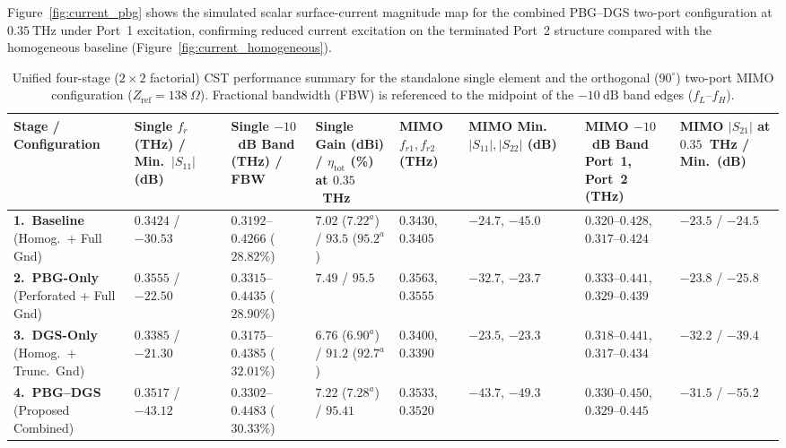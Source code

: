 \documentclass[referee,pdflatex,sn-mathphys-ay]{sn-jnl}
\begin{document}
Figure~\ref{fig:current_pbg} shows the simulated scalar surface-current magnitude map for the combined PBG--DGS two-port configuration at \(0.35~\mathrm{THz}\) under Port~1 excitation, confirming reduced current excitation on the terminated Port~2 structure compared with the homogeneous baseline (Figure~\ref{fig:current_homogeneous}).

\begin{table}[ht]
\caption{Unified four-stage ($2 \times 2$ factorial) CST performance summary for the standalone single element and the orthogonal ($90^{\circ}$) two-port MIMO configuration ($Z_{\mathrm{ref}} = 138~\Omega$). Fractional bandwidth (FBW) is referenced to the midpoint of the $-10~\mathrm{dB}$ band edges ($f_L$--$f_H$).}
\label{tab:four_stage_summary}
\centering
\renewcommand{\arraystretch}{1.2}
\scriptsize
\setlength{\tabcolsep}{3pt}
\begin{tabularx}{\textwidth}{@{}>{\raggedright\arraybackslash}p{2.3cm} C{1.75cm} C{1.85cm} C{2.05cm} C{1.55cm} C{1.65cm} C{1.85cm} >{\centering\arraybackslash}X@{}}
\toprule
\textbf{Stage / Configuration} & \textbf{Single $f_r$ (THz) / Min.\ $|S_{11}|$ (dB)} & \textbf{Single $-10$~dB Band (THz) / FBW} & \textbf{Single Gain (dBi) / $\eta_{\mathrm{tot}}$ (\%) at $0.35$~THz} & \textbf{MIMO $f_{r1}, f_{r2}$ (THz)} & \textbf{MIMO Min.\ $|S_{11}|, |S_{22}|$ (dB)} & \textbf{MIMO $-10$~dB Band Port~1, Port~2 (THz)} & \textbf{MIMO $|S_{21}|$ at $0.35$~THz / Min.\ (dB)} \\
\midrule
\textbf{1.\ Baseline} (Homog.\ + Full Gnd) & $0.3424$ / $-30.53$ & $0.3192$--$0.4266$ ($28.82\%$) & $7.02$ ($7.22^{a}$) / $93.5$ ($95.2^{a}$) & $0.3430$, $0.3405$ & $-24.7$, $-45.0$ & $0.320$--$0.428$, $0.317$--$0.424$ & $-23.5$ / $-24.5$ \\
\textbf{2.\ PBG-Only} (Perforated + Full Gnd) & $0.3555$ / $-22.50$ & $0.3315$--$0.4435$ ($28.90\%$) & $7.49$ / $95.5$ & $0.3563$, $0.3555$ & $-32.7$, $-23.7$ & $0.333$--$0.441$, $0.329$--$0.439$ & $-23.8$ / $-25.8$ \\
\textbf{3.\ DGS-Only} (Homog.\ + Trunc.\ Gnd) & $0.3385$ / $-21.30$ & $0.3175$--$0.4385$ ($32.01\%$) & $6.76$ ($6.90^{a}$) / $91.2$ ($92.7^{a}$) & $0.3400$, $0.3390$ & $-23.5$, $-23.3$ & $0.318$--$0.441$, $0.317$--$0.434$ & $-32.2$ / $-39.4$ \\
\textbf{4.\ PBG--DGS} (Proposed Combined) & $\mathbf{0.3517}$ / $\mathbf{-43.12}$ & $\mathbf{0.3302}$--$\mathbf{0.4483}$ ($\mathbf{30.33\%}$) & $\mathbf{7.22}$ ($7.28^{a}$) / $\mathbf{95.41}$ & $\mathbf{0.3533}$, $\mathbf{0.3520}$ & $\mathbf{-43.7}$, $\mathbf{-49.3}$ & $\mathbf{0.330}$--$\mathbf{0.450}$, $\mathbf{0.329}$--$\mathbf{0.445}$ & $\mathbf{-31.5}$ / $\mathbf{-55.2}$ \\

\end{tabularx}
\end{table}
\end{document}
